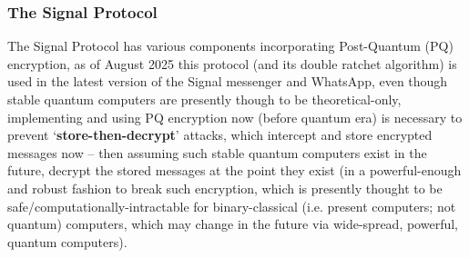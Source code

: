 \subsubsection{The Signal Protocol}
\label{subsubsec:the_signal_protocol}
The Signal Protocol has various components incorporating Post-Quantum (PQ) encryption, as of August 2025 this protocol (and its double ratchet algorithm) is used in the latest version of the Signal messenger and WhatsApp, even though stable quantum computers are presently though to be theoretical-only, implementing and using PQ encryption now (before quantum era) is necessary to prevent `\textbf{store-then-decrypt}' attacks, which intercept and store encrypted messages now -- then assuming such stable quantum computers exist in the future, decrypt the stored messages at the point they exist (in a powerful-enough and robust fashion to break such encryption, which is presently thought to be safe/computationally-intractable for binary-classical (i.e. present computers; not quantum) computers, which may change in the future via wide-spread, powerful, quantum computers).
